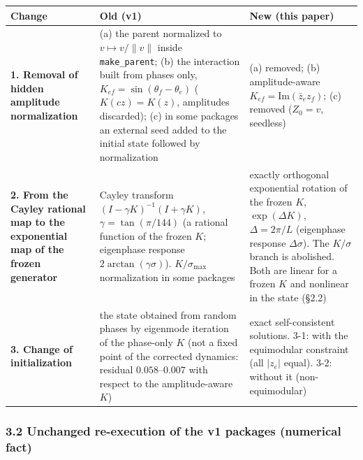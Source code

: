 \documentclass[
  10pt,
  a4paper,
]{article}
\newcounter{none} %
\begin{document}
{\def\LTcaptype{none} %
\begin{longtable}[]{@{}
  >{\raggedright\arraybackslash}p{}
  >{\raggedright\arraybackslash}p{}
  >{\raggedright\arraybackslash}p{}@{}}
\toprule\noalign{}
\begin{minipage}[b]{\linewidth}\raggedright
Change
\end{minipage} & \begin{minipage}[b]{\linewidth}\raggedright
Old (v1)
\end{minipage} & \begin{minipage}[b]{\linewidth}\raggedright
New (this paper)
\end{minipage} \\
\midrule\noalign{}
\endhead
\bottomrule\noalign{}
\endlastfoot
\textbf{1. Removal of hidden amplitude normalization} & (a) the parent
normalized to \(v\mapsto v/\|v\|\) inside \texttt{make\_parent}; (b) the
interaction built from phases only, \(K_{ef}=\sin(\theta_f-\theta_e)\)
(\(K(cz)=K(z)\), amplitudes discarded); (c) in some packages an external
seed added to the initial state followed by normalization & (a) removed;
(b) amplitude-aware \(K_{ef}=\mathrm{Im}(\bar z_ez_f)\); (c) removed
(\(Z_0=v\), seedless) \\
\textbf{2. From the Cayley rational map to the exponential map of the
frozen generator} & Cayley transform \((I-\gamma K)^{-1}(I+\gamma K)\),
\(\gamma=\tan(\pi/144)\) (a rational function of the frozen \(K\);
eigenphase response \(2\arctan(\gamma\sigma)\)). \(K/\sigma_{\max}\)
normalization in some packages & exactly orthogonal exponential rotation
of the frozen \(K\), \(\exp(\Delta K)\), \(\Delta=2\pi/L\) (eigenphase
response \(\Delta\sigma\)). The \(K/\sigma\) branch is abolished. Both
are linear for a frozen \(K\) and nonlinear in the state (§2.2) \\
\textbf{3. Change of initialization} & the state obtained from random
phases by eigenmode iteration of the phase-only \(K\) (not a fixed point
of the corrected dynamics: residual \(0.058\)--\(0.007\) with respect to
the amplitude-aware \(K\)) & exact self-consistent solutions. 3-1: with
the equimodular constraint (all \(|z_e|\) equal). 3-2: without it
(non-equimodular) \\
\end{longtable}
}

\subsubsection{3.2 Unchanged re-execution of the v1 packages (numerical
fact)}\label{unchanged-re-execution-of-the-v1-packages-numerical-fact}
\end{document}
